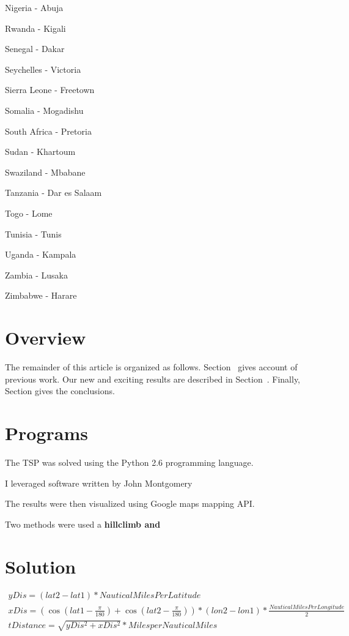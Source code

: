 \documentclass[12pt]{article}
\begin{document}
\begin{multicols}{3}
\begin{enumerate*}
\item Nigeria - Abuja
\item Rwanda - Kigali
\item Senegal - Dakar
\item Seychelles - Victoria
\item Sierra Leone - Freetown
\item Somalia - Mogadishu
\item South Africa - Pretoria
\item Sudan - Khartoum
\item Swaziland - Mbabane
\item Tanzania - Dar es Salaam
\item Togo - Lome
\item Tunisia - Tunis
\item Uganda - Kampala
\item Zambia - Lusaka
\item Zimbabwe - Harare
\end{enumerate*}
\end{multicols}

\section{Overview}
The remainder of this article is organized as follows.
Section~ gives account of previous work.
Our new and exciting results are described in Section~.
Finally, Section gives the conclusions.

\section{Programs}

The TSP was solved using the Python 2.6 programming language.

I leveraged software written by John Montgomery \cite{cite_key2}

The results were then visualized using Google maps mapping API.

Two methods were used a \bf{hillclimb} and

\section{Solution}

\begin{align}
  yDis = ( lat2 - lat1 ) * Nautical Miles Per Latitude\\
  xDis = ( \cos( lat1 - \frac{\pi}{180} ) + \cos( lat2 - \frac{\pi}{180} ) ) * ( lon2 - lon1 ) * \frac{Nautical Miles Per Longitude}{2}\\
  tDistance = \sqrt{ yDis^{2} + xDis^{2} } * Miles per Nautical Miles\\
\end{align}
\end{document}
